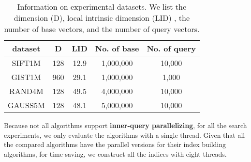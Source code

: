 \documentclass{vldb}
\begin{document}
\begin{table}[t]\scriptsize
\caption{Information on experimental datasets. We list the dimension (D), local intrinsic dimension (LID) \cite{costa2005estimating}, the number of base vectors, and the number of query vectors.}
\label{dataset_info_tb}
\centering
\begin{tabular}{|c|c|c|c|c|}
\hline
dataset &  D & LID &No. of base &No. of query\\
\hline
SIFT1M &  128 & 12.9 & 1,000,000 & 10,000 \\
GIST1M &  960 & 29.1 & 1,000,000 & 1,000 \\
RAND4M & 128 & 49.5 & 4,000,000 & 10,000 \\
GAUSS5M & 128 & 48.1 & 5,000,000 & 10,000 \\
\hline
\end{tabular}
\end{table}
Because not all algorithms support \textbf{inner-query parallelizing}, for all the search experiments, we only evaluate the algorithms with a single thread. Given that all the compared algorithms have the parallel versions for their index building algorithms, for time-saving, we construct all the indices with eight threads. 
\end{document}
